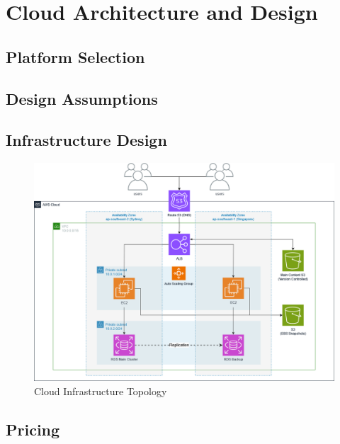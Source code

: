 \section{Cloud Architecture and Design}

\subsection{Platform Selection}



\subsection{Design Assumptions}

\subsection{Infrastructure Design}
\begin{figure}[H]\label{fig:awsdiagram}
    \centering
    \includegraphics[width=\textwidth]{cci_aws}
    \caption{Cloud Infrastructure Topology}
\end{figure}

\subsection{Pricing}

